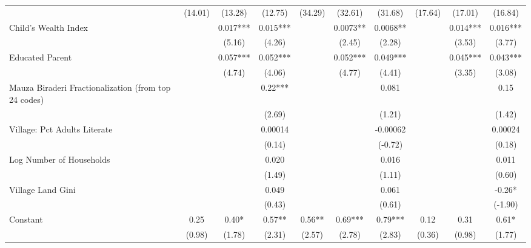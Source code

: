 \begin{sidewaystable}[htbp]
\begin{tabular}{l*{9}{c}}
                &  (14.01)   &  (13.28)   &  (12.75)   &  (34.29)   &  (32.61)   &  (31.68)   &  (17.64)   &  (17.01)   &  (16.84)   \\
Child's Wealth Index&            &    0.017***&    0.015***&            &   0.0073** &   0.0068** &            &    0.014***&    0.016***\\
                &            &   (5.16)   &   (4.26)   &            &   (2.45)   &   (2.28)   &            &   (3.53)   &   (3.77)   \\
Educated Parent &            &    0.057***&    0.052***&            &    0.052***&    0.049***&            &    0.045***&    0.043***\\
                &            &   (4.74)   &   (4.06)   &            &   (4.77)   &   (4.41)   &            &   (3.35)   &   (3.08)   \\
Mauza Biraderi Fractionalization (from top 24 codes)&            &            &     0.22***&            &            &    0.081   &            &            &     0.15   \\
                &            &            &   (2.69)   &            &            &   (1.21)   &            &            &   (1.42)   \\
Village: Pct Adults Literate&            &            &  0.00014   &            &            & -0.00062   &            &            &  0.00024   \\
                &            &            &   (0.14)   &            &            &  (-0.72)   &            &            &   (0.18)   \\
Log Number of Households&            &            &    0.020   &            &            &    0.016   &            &            &    0.011   \\
                &            &            &   (1.49)   &            &            &   (1.11)   &            &            &   (0.60)   \\
Village Land Gini&            &            &    0.049   &            &            &    0.061   &            &            &    -0.26*  \\
                &            &            &   (0.43)   &            &            &   (0.61)   &            &            &  (-1.90)   \\
Constant        &     0.25   &     0.40*  &     0.57** &     0.56** &     0.69***&     0.79***&     0.12   &     0.31   &     0.61*  \\
                &   (0.98)   &   (1.78)   &   (2.31)   &   (2.57)   &   (2.78)   &   (2.83)   &   (0.36)   &   (0.98)   &   (1.77)   \\

\end{tabular}
\end{sidewaystable}
